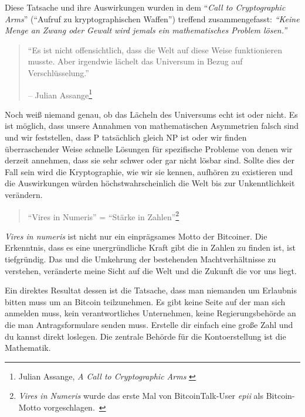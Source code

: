 Diese Tatsache und ihre Auswirkungen wurden in dem \enquote{\textit{Call to
Cryptographic Arms}} (\enquote{Aufruf zu kryptographischen Waffen}) treffend
zusammengefasst: \textit{\enquote{Keine Menge an Zwang oder Gewalt wird jemals
ein mathematisches Problem lösen.}}

\begin{quotation}\begin{samepage}
\enquote{Es ist nicht offensichtlich, dass die Welt auf diese Weise
funktionieren musste. Aber irgendwie lächelt das Universum in Bezug auf
Verschlüsselung.}
\begin{flushright} -- Julian Assange\footnote{Julian Assange, \textit{A Call to Cryptographic Arms} \cite{call-to-cryptographic-arms}}
\end{flushright}\end{samepage}\end{quotation}

Noch weiß niemand genau, ob das Lächeln des Universums echt ist oder nicht. Es
ist möglich, dass unsere Annahmen von mathematischen Asymmetrien falsch sind und
wir feststellen, dass P tatsächlich gleich NP \cite{wiki:pnp} ist oder wir
finden überraschender Weise schnelle Lösungen für spezifische Probleme
\cite{wiki:discrete-log} von denen wir derzeit annehmen, dass sie sehr schwer
oder gar nicht lösbar sind. Sollte dies der Fall sein wird die Kryptographie,
wie wir sie kennen, aufhören zu existieren und die Auswirkungen würden
höchstwahrscheinlich die Welt bis zur Unkenntlichkeit verändern.

\begin{quotation}\begin{samepage}
\enquote{Vires in Numeris} = \enquote{Stärke in Zahlen}\footnote{\textit{Vires
in Numeris} wurde das erste Mal von BitcoinTalk-User \textit{epii} als
Bitcoin-Motto vorgeschlagen.~\cite{epii}}
\end{samepage}\end{quotation}

\textit{Vires in numeris} ist nicht nur ein einprägsames Motto der Bitcoiner.
Die Erkenntnis, dass es eine unergründliche Kraft gibt die in Zahlen zu finden
ist, ist tiefgründig. Das und die Umkehrung der bestehenden Machtverhältnisse zu
verstehen, veränderte meine Sicht auf die Welt und die Zukunft die vor uns
liegt.

Ein direktes Resultat dessen ist die Tatsache, dass man niemanden um Erlaubnis
bitten muss um an Bitcoin teilzunehmen. Es gibt keine Seite auf der man sich
anmelden muss, kein verantwortliches Unternehmen, keine Regierungsbehörde an die
man Antragsformulare senden muss. Erstelle dir einfach eine große Zahl und du
kannst direkt loslegen. Die zentrale Behörde für die Kontoerstellung ist die
Mathematik.

